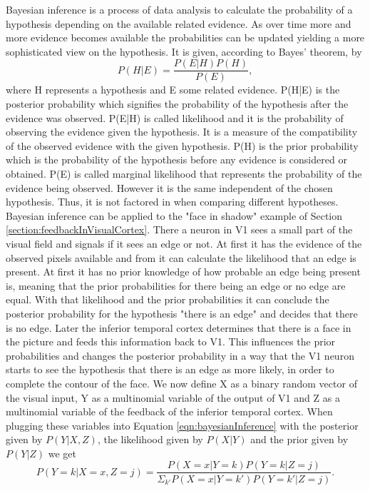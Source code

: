 Bayesian inference is a process of data analysis to calculate the probability of a hypothesis depending on the available related evidence. As over time more and more evidence becomes available the probabilities can be updated yielding a more sophisticated view on the hypothesis. It is given, according to Bayes' theorem, by
\begin{equation}
\label{eqn:bayesianInference}
P(H|E) = \frac{P(E|H)P(H)}{P(E)},
\end{equation}
where H represents a hypothesis and E some related evidence. P(H|E) is the posterior probability which signifies the probability of the hypothesis after the evidence was observed. P(E|H) is called likelihood and it is the probability of observing the evidence 	given the hypothesis. It is a measure of the compatibility of the observed evidence with the given hypothesis. P(H) is the prior probability which is the probability of the hypothesis before any evidence is considered or obtained. P(E) is called marginal likelihood that represents the probability of the evidence being observed. However it is the same independent of the chosen hypothesis. Thus, it is not factored in when comparing different hypotheses.
Bayesian inference can be applied to the "face in shadow" example of Section \ref{section:feedbackInVisualCortex}. There a neuron in V1 sees a small part of the visual field and signals if it sees an edge or not. At first it has the evidence of the observed pixels available and from it can calculate the likelihood that an edge is present. At first it has no prior knowledge of how probable an edge being present is, meaning that the prior probabilities for there being an edge or no edge are equal. With that likelihood and the prior probabilities it can conclude the posterior probability for the hypothesis "there is an edge" and decides that there is no edge.
Later the inferior temporal cortex determines that there is a face in the picture and feeds this information back to V1. This influences the prior probabilities and changes the posterior probability in a way that the V1 neuron starts to see the hypothesis that there is an edge as more likely, in order to complete the contour of the face. 
We now define X as a binary random vector of the visual input, Y as a multinomial variable of the output of V1 and Z as a multinomial variable of the feedback of the inferior temporal cortex.
When plugging these variables into Equation \ref{eqn:bayesianInference} with the posterior given by $P(Y|X,Z)$, the likelihood given by $P(X|Y)$ and the prior given by $P(Y|Z)$ we get
\begin{equation}
\label{eqn:pYvorausgesetztXUndZ}
P(Y = k|X = x, Z = j) = \frac{P(X=x|Y=k)P(Y = k|Z = j)}{\Sigma_{k'}P(X=x|Y=k')P(Y=k'|Z=j)}.
\end{equation}

